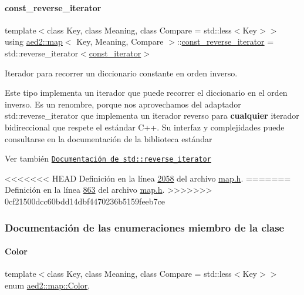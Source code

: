 \paragraph{\texorpdfstring{const\+\_\+reverse\+\_\+iterator}{const\_reverse\_iterator}}
{\footnotesize\ttfamily template$<$class Key, class Meaning, class Compare = std\+::less$<$\+Key$>$$>$ \\
using \hyperlink{classaed2_1_1map}{aed2\+::map}$<$ Key, Meaning, Compare $>$\+::\hyperlink{classaed2_1_1map_aed66a216549d13078a3ea6978ea0b768_aed66a216549d13078a3ea6978ea0b768}{const\+\_\+reverse\+\_\+iterator} =  std\+::reverse\+\_\+iterator$<$\hyperlink{classaed2_1_1map_1_1const__iterator}{const\+\_\+iterator}$>$}



Iterador para recorrer un diccionario constante en orden inverso. 

Este tipo implementa un iterador que puede recorrer el diccionario en el orden inverso. Es un renombre, porque nos aprovechamos del adaptador {\ttfamily std\+::reverse\+\_\+iterator} que implementa un iterador reverso para {\bfseries cualquier} iterador bidireccional que respete el estándar C++. Su interfaz y complejidades puede consultarse en la documentación de la biblioteca estándar

\begin{DoxySeeAlso}{Ver también}
\href{http://en.cppreference.com/w/cpp/iterator/reverse_iterator}{\tt Documentación de {\ttfamily std\+::reverse\+\_\+iterator}} 
\end{DoxySeeAlso}


<<<<<<< HEAD
\-Definición en la línea \hyperlink{map_8h_source_l02058}{2058} del archivo \hyperlink{map_8h_source}{map.\-h}.
=======
Definición en la línea \hyperlink{map_8h_source_l00863}{863} del archivo \hyperlink{map_8h_source}{map.\+h}.
>>>>>>> 0cf21500dcc60bdd14dbf4470236b5159feeb7ce



\subsubsection{Documentación de las enumeraciones miembro de la clase}
\mbox{\label{classaed2_1_1map_a6d62a415a4b9d320b30cada4ebcf9f5b_a6d62a415a4b9d320b30cada4ebcf9f5b}} 
\paragraph{\texorpdfstring{Color}{Color}}
{\footnotesize\ttfamily template$<$class Key, class Meaning, class Compare = std\+::less$<$\+Key$>$$>$ \\
enum \hyperlink{classaed2_1_1map_a6d62a415a4b9d320b30cada4ebcf9f5b_a6d62a415a4b9d320b30cada4ebcf9f5b}{aed2\+::map\+::\+Color}\hspace{0.3cm}{\ttfamily [strong]}, {\ttfamily [private]}}




